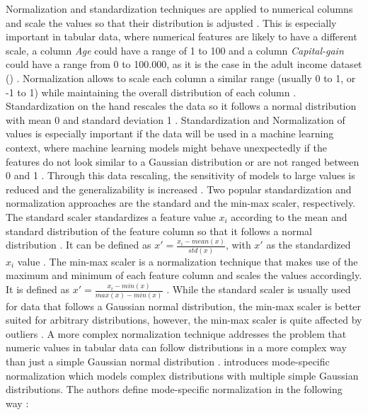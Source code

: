 Normalization and standardization techniques are applied to numerical columns and scale the values so that their distribution is adjusted \cite{garcia2016BigDataPreprocessing}.
This is especially important in tabular data, where numerical features are likely to have a different scale, \eg a column \textit{Age} could have a range of 1 to 100 and a column \textit{Capital-gain} could have a range from 0 to 100.000, as it is the case in the adult income dataset () \cite{Dua:2019}.
Normalization allows to scale each column a similar range (usually 0 to 1, or -1 to 1) while maintaining the overall distribution of each column \cite{izonin2022TwoStepDataNormalization}.
Standardization on the hand rescales the data so it follows a normal distribution with mean 0 and standard deviation 1 \cite{scikit-learndevelopers2023PreprocessingData}.
Standardization and Normalization of values is especially important if the data will be used in a machine learning context, where machine learning models might behave unexpectedly if 
the features do not look similar to a Gaussian distribution or are not ranged between 0 and 1 \cite{scikit-learn, scikit-learndevelopers2023PreprocessingData}.
Through this data rescaling, the sensitivity of models to large values is reduced and the generalizability is increased \cite{izonin2022TwoStepDataNormalization}.
Two popular standardization and normalization approaches are the standard and the min-max scaler, respectively.
The standard scaler standardizes a feature value $x_i$ according to the mean and standard distribution of the feature column so that it follows a normal distribution \cite{garcia2016BigDataPreprocessing, izonin2022TwoStepDataNormalization}.
It can be defined as $x' = \frac{x_i-mean(x)}{std(x)}$, with $x'$ as the standardized $x_i$ value \cite{izonin2022TwoStepDataNormalization}.
The min-max scaler is a normalization technique that makes use of the maximum and minimum of each feature column and scales the values accordingly.
It is defined as $x' = \frac{x_i - min(x)}{max(x) - min(x)}$ \cite{izonin2022TwoStepDataNormalization}.
While the standard scaler is usually used for data that follows a Gaussian normal distribution, the min-max scaler is better suited for arbitrary distributions, however, the min-max scaler is quite affected by outliers \cite{choudhury2020FeatureScalingEffect}.
A more complex normalization technique addresses the problem that numeric values in tabular data can follow distributions in a more complex way than just a simple Gaussian normal distribution \cite{zhao2022CTABGANEnhancingTabular, xu2019ModelingTabularData}.
\textcite{xu2019ModelingTabularData} introduces mode-specific normalization which models complex distributions with multiple simple Gaussian distributions.
The authors define mode-specific normalization in the following way \cite[p. 3-4]{xu2019ModelingTabularData}:

